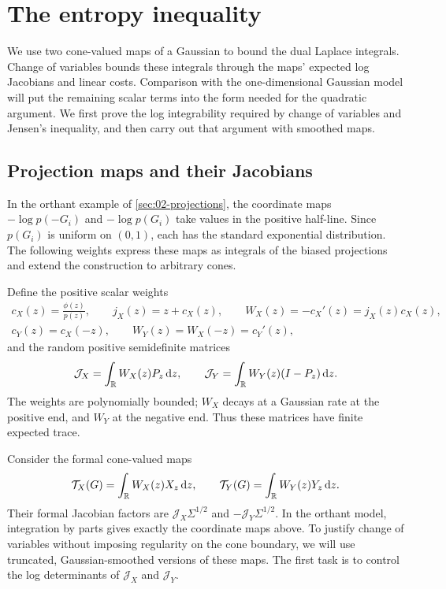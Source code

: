\section{The entropy inequality}\label{sec:03-entropy}

We use two cone-valued maps of a Gaussian to bound the dual Laplace integrals. Change of variables bounds these integrals through the maps' expected log Jacobians and linear costs. Comparison with the one-dimensional Gaussian model will put the remaining scalar terms into the form needed for the quadratic argument. We first prove the log integrability required by change of variables and Jensen's inequality, and then carry out that argument with smoothed maps.

\subsection{Projection maps and their Jacobians}
In the orthant example of \cref{sec:02-projections}, the coordinate maps $-\log p(-G_i)$ and $-\log p(G_i)$ take values in the positive half-line. Since $p(G_i)$ is uniform on $(0,1)$, each has the standard exponential distribution. The following weights express these maps as integrals of the biased projections and extend the construction to arbitrary cones.

Define the positive scalar weights
\[
\begin{gathered}
c_X(z)=\frac{\phi(z)}{p(z)},\qquad j_X(z)=z+c_X(z),\qquad
W_X(z)=-c_X'(z)=j_X(z)c_X(z),\\
c_Y(z)=c_X(-z),\qquad W_Y(z)=W_X(-z)=c_Y'(z),
\end{gathered}
\]
and the random positive semidefinite matrices
\[
\mathcal{J}_X=\int_{\mathbb{R}}W_X(z)P_z\,\mathrm{d} z,\qquad
\mathcal{J}_Y=\int_{\mathbb{R}}W_Y(z)(I-P_z)\,\mathrm{d} z.
\]
The weights are polynomially bounded; $W_X$ decays at a Gaussian rate at the positive end, and $W_Y$ at the negative end. Thus these matrices have finite expected trace.


Consider the formal cone-valued maps
\[
 \mathcal{T}_X(G)=\int_{\mathbb{R}}W_X(z)X_z\,\mathrm{d} z,
 \qquad
 \mathcal{T}_Y(G)=\int_{\mathbb{R}}W_Y(z)Y_z\,\mathrm{d} z.
\]
Their formal Jacobian factors are $\mathcal{J}_X\Sigma^{1/2}$ and $-\mathcal{J}_Y\Sigma^{1/2}$. In the orthant model, integration by parts gives exactly the coordinate maps above. To justify change of variables without imposing regularity on the cone boundary, we will use truncated, Gaussian-smoothed versions of these maps. The first task is to control the log determinants of $\mathcal{J}_X$ and $\mathcal{J}_Y$.


